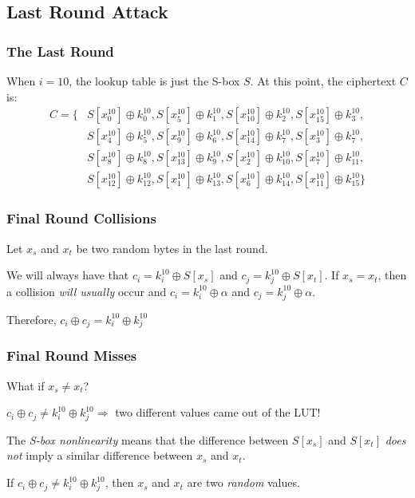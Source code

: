 \documentclass[9pt,handout]{beamer}
\begin{document}
\subsection{Last Round Attack}
\begin{frame}
	\frametitle{The Last Round}
	When $i = 10$, the lookup table is just the S-box $S$. At this point, the ciphertext $C$ is:
\begin{align*}
C = \{ & S[x_0^{10}] \oplus k_0^{10}, S[x_5^{10}] \oplus k_1^{10}, S[x_{10}^{10}] \oplus k_2^{10}, S[x_{15}^{10}] \oplus k_3^{10}, \\
& S[x_4^{10}] \oplus k_5^{10}, S[x_9^{10}] \oplus k_6^{10}, S[x_{14}^{10}] \oplus k_7^{10}, S[x_3^{10}] \oplus k_7^{10}, \\
& S[x_8^{10}] \oplus k_8^{10}, S[x_{13}^{10}] \oplus k_9^{10}, S[x_2^{10}] \oplus k_{10}^{10}, S[x_7^{10}] \oplus k_{11}^{10}, \\
& S[x_{12}^{10}] \oplus k_{12}^{10}, S[x_{1}^{10}] \oplus k_{13}^{10}, S[x_6^{10}] \oplus k_{14}^{10}, S[x_{11}^{10}] \oplus k_{15}^{10}\} 
\end{align*}
\end{frame}

\begin{frame}
	\frametitle{Final Round Collisions}
	Let $x_s$ and $x_t$ be two random bytes in the last round. 
	
	\bigskip
	
	We will always have that $c_i = k_i^{10} \oplus S[x_s]$ and $c_j = k_j^{10} \oplus S[x_t]$. If $x_s = x_t$, then a collision \emph{will usually} occur
	and $c_i = k_i^{10} \oplus \alpha$ and $c_j = k_j^{10} \oplus \alpha$.
	
	\bigskip

	Therefore, $c_i \oplus c_j = k_i^{10} \oplus k_j^{10}$
	
\end{frame}

\begin{frame}
	\frametitle{Final Round Misses}
	
	What if $x_s \not= x_t$?
	
	\bigskip 
	
	$c_i \oplus c_j \not= k_i^{10} \oplus k_j^{10} \Rightarrow$ two different values came out of the LUT!
	
	\bigskip
	
	The \emph{S-box nonlinearity} means that the difference between $S[x_s]$ and $S[x_t]$ \emph{does not} imply a similar difference between $x_s$ and $x_t$. 
	
	\bigskip
	
	 If $c_i \oplus c_j \not= k_i^{10} \oplus k_j^{10}$, then $x_s$ and $x_t$ are two \emph{random} values.
\end{frame}
\end{document}
